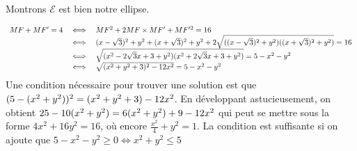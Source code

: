 \documentclass[12pt,a4paper,french]{article}
\begin{document}
\begin{solution}
\begin{enumerate}
Montrons $\mathcal{E}$ est bien notre ellipse.

\[ \begin{array}{ccl} MF + MF' = 4 & \iff & MF^2 + 2MF \times MF' + MF'^2 = 16 \\
 & \iff & \brk*{x - \sqrt{3}}^2 + y^2 + \brk*{x + \sqrt{3}}^2 + y^2 + 2\sqrt{\brk*{ 
 \brk*{x - \sqrt{3}}^2 + y^2} \brk*{\brk*{x + \sqrt{3}}^2 + y^2}} = 16 \\
 & \iff & \sqrt{\brk*{x^2 - 2\sqrt{3}x +3 + y^2} \brk*{x^2 + 2\sqrt{3}x +3 + y^2}} =
 5 - x^2 - y^2 \\
 & \iff & \sqrt{\brk*{x^2 + y^2 + 3}^2 - 12x^2 } = 5 - x^2 - y^2
\end{array} \]
Une condition nécessaire pour trouver une solution est que $\brk*{5 - \brk*{x^2 + y^2}
}^2 = \brk*{x^2 + y^2 + 3} - 12x^2$. En développant astucieusement, on obtient $25 - 10
\brk*{x^2 + y^2} = 6\brk*{x^2 + y^2} + 9 -12x^2$ qui peut se mettre sous la forme $4x^2 
+ 16y^2 = 16$, où encore $\frac{x^2}{4} + y^2 = 1$. La condition est suffisante si on  
ajoute que $5 - x^2 - y^2 \geqslant 0 \iff x^2 + y^2 \leqslant 5$ 
    \end{enumerate}
\end{solution}
\end{document}
